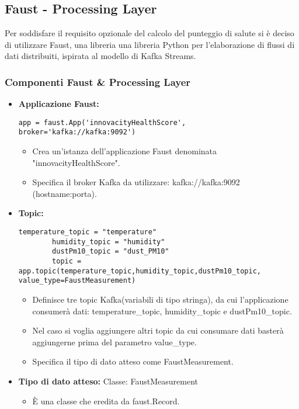 \subsection{Faust - Processing Layer}
Per soddisfare il requisito opzionale del calcolo del punteggio di salute si è deciso di utilizzare Faust, una libreria una libreria Python per l'elaborazione di flussi di dati distribuiti, ispirata al modello di Kafka Streams.

\subsubsection{Componenti Faust \& Processing Layer}
\begin{itemize}
    \item \textbf{Applicazione Faust:}
    \begin{lstlisting}[style=code]
        app = faust.App('innovacityHealthScore', broker='kafka://kafka:9092')
    \end{lstlisting} 
    \begin{itemize}
        \item Crea un'istanza dell'applicazione Faust denominata "innovacityHealthScore".
        \item Specifica il broker Kafka da utilizzare: kafka://kafka:9092 (hostname:porta).
    \end{itemize}
    \item \textbf{Topic:}
    \begin{lstlisting}[style=code]
        temperature_topic = "temperature"
        humidity_topic = "humidity"
        dustPm10_topic = "dust_PM10"
        topic = app.topic(temperature_topic,humidity_topic,dustPm10_topic, value_type=FaustMeasurement)
    \end{lstlisting}  
    \begin{itemize}
        \item Definisce tre topic Kafka(variabili di tipo stringa), da cui l'applicazione consumerà dati: temperature\_topic, humidity\_topic e dustPm10\_topic.
        \item Nel caso si voglia aggiungere altri topic da cui consumare dati basterà aggiungerne prima del parametro value\_type.
        \item Specifica il tipo di dato atteso come FaustMeasurement.
    \end{itemize}
    \item \textbf{Tipo di dato atteso:} Classe: FaustMeasurement
    \begin{itemize}
        \item È una classe che eredita da faust.Record.

\end{itemize}
\end{itemize}

